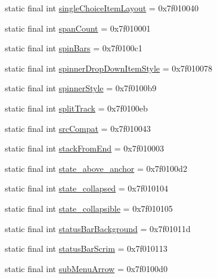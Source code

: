 \begin{CompactItemize}
static final int \hyperlink{classandroid_1_1support_1_1v7_1_1appcompat_1_1_r_1_1attr_ff5f0196bcdb90cf8d2d2ba327b46583}{singleChoiceItemLayout} = 0x7f010040
\item 
static final int \hyperlink{classandroid_1_1support_1_1v7_1_1appcompat_1_1_r_1_1attr_d225375ed3d6eefe8afa82c6b0e4a982}{spanCount} = 0x7f010001
\item 
static final int \hyperlink{classandroid_1_1support_1_1v7_1_1appcompat_1_1_r_1_1attr_c2d4f3e530c2763939d12a7c0c36fe35}{spinBars} = 0x7f0100c1
\item 
static final int \hyperlink{classandroid_1_1support_1_1v7_1_1appcompat_1_1_r_1_1attr_73f37c28bff20cd3d7f6912ce74742ff}{spinnerDropDownItemStyle} = 0x7f010078
\item 
static final int \hyperlink{classandroid_1_1support_1_1v7_1_1appcompat_1_1_r_1_1attr_24d201f044f0d5b840ca6de000935185}{spinnerStyle} = 0x7f0100b9
\item 
static final int \hyperlink{classandroid_1_1support_1_1v7_1_1appcompat_1_1_r_1_1attr_70ef0c886c3a0e04aaa65552666d0dc7}{splitTrack} = 0x7f0100eb
\item 
static final int \hyperlink{classandroid_1_1support_1_1v7_1_1appcompat_1_1_r_1_1attr_7fe67edf594ad36a015103190d7a2c5d}{srcCompat} = 0x7f010043
\item 
static final int \hyperlink{classandroid_1_1support_1_1v7_1_1appcompat_1_1_r_1_1attr_caefa11e05fb3470024f37417e2c22e0}{stackFromEnd} = 0x7f010003
\item 
static final int \hyperlink{classandroid_1_1support_1_1v7_1_1appcompat_1_1_r_1_1attr_4e389c0a38925bbfaf137ea0e724cf2c}{state\_\-above\_\-anchor} = 0x7f0100d2
\item 
static final int \hyperlink{classandroid_1_1support_1_1v7_1_1appcompat_1_1_r_1_1attr_0c74679a3e29b8549c82a18b72b98fad}{state\_\-collapsed} = 0x7f010104
\item 
static final int \hyperlink{classandroid_1_1support_1_1v7_1_1appcompat_1_1_r_1_1attr_e6f01b270019836b9e63f3e1a95c7671}{state\_\-collapsible} = 0x7f010105
\item 
static final int \hyperlink{classandroid_1_1support_1_1v7_1_1appcompat_1_1_r_1_1attr_2cf8b6fe98e955d4fecf46deaeeaf5c7}{statusBarBackground} = 0x7f01011d
\item 
static final int \hyperlink{classandroid_1_1support_1_1v7_1_1appcompat_1_1_r_1_1attr_f31078a338e56e706cda378a30ce1264}{statusBarScrim} = 0x7f010113
\item 
static final int \hyperlink{classandroid_1_1support_1_1v7_1_1appcompat_1_1_r_1_1attr_00b5715e5b7e84a2dc944de3c657c398}{subMenuArrow} = 0x7f0100d0

\end{CompactItemize}
